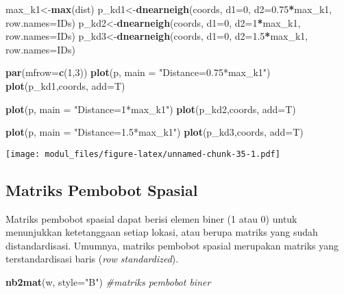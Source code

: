 \documentclass[
]{book}
\newenvironment{Shaded}{\begin{snugshade}}{\end{snugshade}}
\newcommand{\CommentTok}[1]{\textcolor[rgb]{0.56,0.35,0.01}{\textit{#1}}}
\newcommand{\DataTypeTok}[1]{\textcolor[rgb]{0.13,0.29,0.53}{#1}}
\newcommand{\DecValTok}[1]{\textcolor[rgb]{0.00,0.00,0.81}{#1}}
\newcommand{\FloatTok}[1]{\textcolor[rgb]{0.00,0.00,0.81}{#1}}
\newcommand{\KeywordTok}[1]{\textcolor[rgb]{0.13,0.29,0.53}{\textbf{#1}}}
\newcommand{\NormalTok}[1]{#1}
\newcommand{\OperatorTok}[1]{\textcolor[rgb]{0.81,0.36,0.00}{\textbf{#1}}}
\newcommand{\StringTok}[1]{\textcolor[rgb]{0.31,0.60,0.02}{#1}}
\begin{document}
\begin{Shaded}
\begin{Highlighting}[]
\NormalTok{max\_k1\textless{}{-}}\KeywordTok{max}\NormalTok{(dist)}
\NormalTok{p\_kd1\textless{}{-}}\KeywordTok{dnearneigh}\NormalTok{(coords, }\DataTypeTok{d1=}\DecValTok{0}\NormalTok{, }\DataTypeTok{d2=}\FloatTok{0.75}\OperatorTok{*}\NormalTok{max\_k1, }\DataTypeTok{row.names=}\NormalTok{IDs)}
\NormalTok{p\_kd2\textless{}{-}}\KeywordTok{dnearneigh}\NormalTok{(coords, }\DataTypeTok{d1=}\DecValTok{0}\NormalTok{, }\DataTypeTok{d2=}\DecValTok{1}\OperatorTok{*}\NormalTok{max\_k1, }\DataTypeTok{row.names=}\NormalTok{IDs)}
\NormalTok{p\_kd3\textless{}{-}}\KeywordTok{dnearneigh}\NormalTok{(coords, }\DataTypeTok{d1=}\DecValTok{0}\NormalTok{, }\DataTypeTok{d2=}\FloatTok{1.5}\OperatorTok{*}\NormalTok{max\_k1, }\DataTypeTok{row.names=}\NormalTok{IDs)}

\KeywordTok{par}\NormalTok{(}\DataTypeTok{mfrow=}\KeywordTok{c}\NormalTok{(}\DecValTok{1}\NormalTok{,}\DecValTok{3}\NormalTok{))}
\KeywordTok{plot}\NormalTok{(p, }\DataTypeTok{main =} \StringTok{"Distance=0.75*max\_k1"}\NormalTok{)}
\KeywordTok{plot}\NormalTok{(p\_kd1,coords, }\DataTypeTok{add=}\NormalTok{T)}

\KeywordTok{plot}\NormalTok{(p, }\DataTypeTok{main =} \StringTok{"Distance=1*max\_k1"}\NormalTok{)}
\KeywordTok{plot}\NormalTok{(p\_kd2,coords, }\DataTypeTok{add=}\NormalTok{T)}

\KeywordTok{plot}\NormalTok{(p, }\DataTypeTok{main =} \StringTok{"Distance=1.5*max\_k1"}\NormalTok{)}
\KeywordTok{plot}\NormalTok{(p\_kd3,coords, }\DataTypeTok{add=}\NormalTok{T)}
\end{Highlighting}
\end{Shaded}

\texttt{[image: modul\_files/figure-latex/unnamed-chunk-35-1.pdf]}

\hypertarget{matriks-pembobot-spasial}{%
\subsection{Matriks Pembobot Spasial}\label{matriks-pembobot-spasial}}

Matriks pembobot spasial dapat berisi elemen biner (1 atau 0) untuk menunjukkan ketetanggaan setiap lokasi, atau berupa matriks yang sudah distandardisasi. Umumnya, matriks pembobot spasial merupakan matriks yang terstandardisasi baris (\emph{row standardized}).

\begin{Shaded}
\begin{Highlighting}[]
\KeywordTok{nb2mat}\NormalTok{(w, }\DataTypeTok{style=}\StringTok{"B"}\NormalTok{)  }\CommentTok{\#matriks pembobot biner}
\end{Highlighting}
\end{Shaded}
\end{document}
